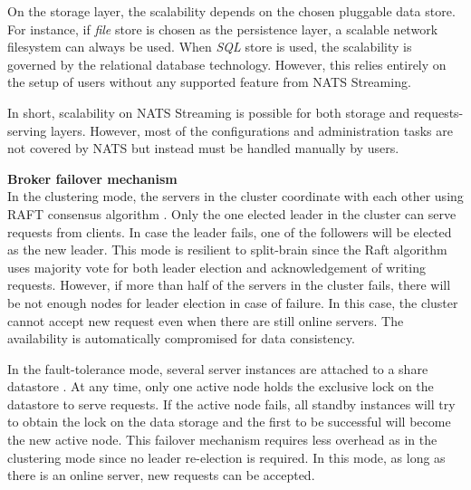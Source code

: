 On the storage layer, the scalability depends on the chosen pluggable data store. For instance, if \emph{file} store is chosen as the persistence layer, a scalable network filesystem can always be used. When \emph{SQL} store is used, the scalability is governed by the relational database technology. However, this relies entirely on the setup of users without any supported feature from NATS Streaming. 

In short, scalability on NATS Streaming is possible for both storage and requests-serving layers. However, most of the configurations and administration tasks are not covered by NATS but instead must be handled manually by users. 

\textbf{Broker failover mechanism}\\
In the clustering mode, the servers in the cluster coordinate with each other using RAFT consensus algorithm \cite{raftalg}. Only the one elected leader in the cluster can serve requests from clients. In case the leader fails, one of the followers will be elected as the new leader. This mode is resilient to split-brain since the Raft algorithm uses majority vote for both leader election and acknowledgement of writing requests. However, if more than half of the servers in the cluster fails, there will be not enough nodes for leader election in case of failure. In this case, the cluster cannot accept new request even when there are still online servers. The availability is automatically compromised for data consistency. 

In the fault-tolerance mode, several server instances are attached to a share datastore \cite{natsstreaming}. At any time, only one active node holds the exclusive lock on the datastore to serve requests. If the active node fails, all standby instances will try to obtain the lock on the data storage and the first to be successful will become the new active node. This failover mechanism requires less overhead as in the clustering mode since no leader re-election is required. In this mode, as long as there is an online server, new requests can be accepted.